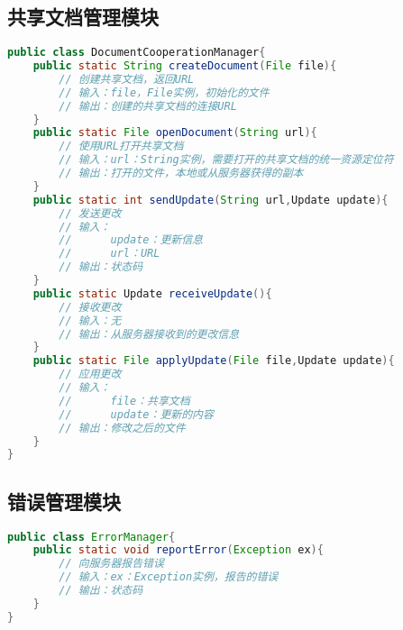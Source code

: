\subsection{\color{red}共享文档管理模块}
\begin{lstlisting}[language=Java, caption=共享文档管理模块接口]
public class DocumentCooperationManager{
    public static String createDocument(File file){
        // 创建共享文档，返回URL
        // 输入：file，File实例，初始化的文件
        // 输出：创建的共享文档的连接URL
    }
    public static File openDocument(String url){
        // 使用URL打开共享文档
        // 输入：url：String实例，需要打开的共享文档的统一资源定位符
        // 输出：打开的文件，本地或从服务器获得的副本
    }
    public static int sendUpdate(String url,Update update){
        // 发送更改
        // 输入： 
        //      update：更新信息
        //      url：URL
        // 输出：状态码
    }
    public static Update receiveUpdate(){
        // 接收更改
        // 输入：无
        // 输出：从服务器接收到的更改信息
    }
    public static File applyUpdate(File file,Update update){
        // 应用更改
        // 输入：
        //      file：共享文档
        //      update：更新的内容
        // 输出：修改之后的文件
    }
}
\end{lstlisting}

\subsection{\color{red}错误管理模块}
\begin{lstlisting}[language=Java, caption=错误管理模块接口]
public class ErrorManager{
    public static void reportError(Exception ex){
        // 向服务器报告错误
        // 输入：ex：Exception实例，报告的错误
        // 输出：状态码
    }
}
\end{lstlisting}


